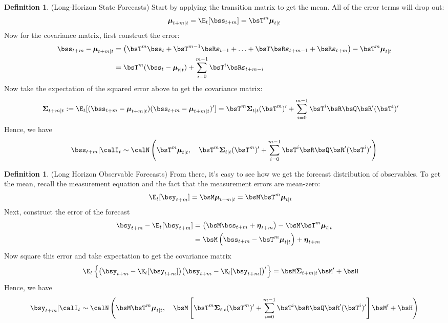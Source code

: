 \documentclass[12pt]{article}
\theoremstyle{plain}
\theoremstyle{definition}
\newtheorem{defn}[thm]{Definition}
\theoremstyle{remark}
\newcommand{\bseta}{\boldsymbol{\eta}}
\newcommand{\bsmu}{\boldsymbol{\mu}}
\newcommand{\bsSigma}{\boldsymbol{\Sigma}}
\newcommand{\bsvarepsilon}{\boldsymbol{\varepsilon}}
\begin{document}
\begin{defn}(Long-Horizon State Forecasts)
Start by applying the transition matrix to get the mean. All of the
error terms will drop out:
\begin{align*}
  \bsmu_{t+m|t} =
  \E_t[\bss_{t+m}] =
  \bsT^m \bsmu_{t|t}
\end{align*}
Now for the covariance matrix, first construct the error:
\begin{align*}
  \bss_{t+m} - \bsmu_{t+m|t} &=
  \left(\bsT^m \bss_t + \bsT^{m-1} \bsR\bsvarepsilon_{t+1}
  + \ldots
  + \bsT\bsR\bsvarepsilon_{t+m-1} + \bsR\bsvarepsilon_{t+m}\right)
  - \bsT^m \bsmu_{t|t}\\
  &= \bsT^m (\bss_t-\bsmu_{t|t})
  + \sum_{i=0}^{m-1} \bsT^i\bsR\bsvarepsilon_{t+m-i}
\end{align*}
Now take the expectation of the squared error above to get the
covariance matrix:
\begin{align*}
  \bsSigma_{t+m|t} &:=
    \E_t[(\bss_{t+m} - \bsmu_{t+m|t})(\bss_{t+m} - \bsmu_{t+m|t})']
    = \bsT^m \bsSigma_{t|t}(\bsT^m)'
      + \sum_{i=0}^{m-1} \bsT^i\bsR\bsQ\bsR'(\bsT^i)'
\end{align*}
Hence, we have
\begin{align*}
  \bss_{t+m}|\calI_t
  \sim
  \calN\left(
    \bsT^m\bsmu_{t|t},\quad
    \bsT^m \bsSigma_{t|t}(\bsT^m)'
      + \sum_{i=0}^{m-1} \bsT^i\bsR\bsQ\bsR'(\bsT^i)'
  \right)
\end{align*}
\end{defn}

\begin{defn}(Long Horizon Observable Forecasts)
From there, it's easy to see how we get the forecast distribution of
observables. To get the mean, recall the measurement equation and the
fact that the measurement errors are mean-zero:
\begin{align*}
  \E_t[\bsy_{t+m}] &=
    \bsM\bsmu_{t+m|t} =
    \bsM \bsT^m \bsmu_{t|t}
\end{align*}
Next, construct the error of the forecast
\begin{align*}
  \bsy_{t+m} - \E_t[\bsy_{t+m}] &=
    \left(\bsM\bss_{t+m} + \bseta_{t+m}\right)
    - \bsM\bsT^m\bsmu_{t|t}
  \\
  &= \bsM\left(\bss_{t+m}-\bsT^m\bsmu_{t|t}\right) + \bseta_{t+m}
\end{align*}
Now square this error and take expectation to get the covariance matrix
\begin{align*}
  \E_t\left\{
    \big(
    \bsy_{t+m} - \E_t[\bsy_{t+m}]
    \big)
    \big(
    \bsy_{t+m} - \E_t[\bsy_{t+m}]
    \big)'
  \right\} &= \bsM\bsSigma_{t+m|t}\bsM' + \bsH
\end{align*}
Hence, we have
\begin{align*}
  \bsy_{t+m}|\calI_t
  \sim
  \calN\left(
    \bsM\bsT^m\bsmu_{t|t},\quad
    \bsM\left[
    \bsT^m \bsSigma_{t|t}(\bsT^m)'
      + \sum_{i=0}^{m-1} \bsT^i\bsR\bsQ\bsR'(\bsT^i)'
    \right]\bsM'
    +\bsH
  \right)
\end{align*}
\end{defn}
\end{document}
